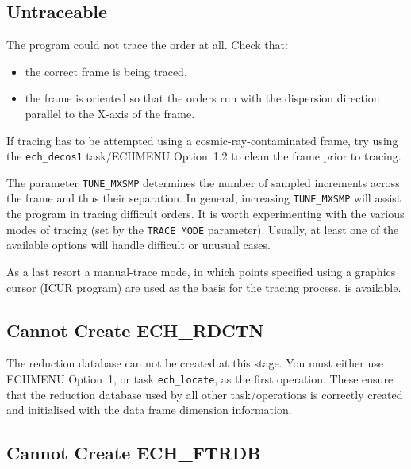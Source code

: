 \documentclass[11pt,twoside]{article}
\newcommand{\htmlref}[2]{#1}
\newcommand{\xlabel}[1]{}
\newcommand{\mlabel}[1]{\xlabel{#1}\label{#1}}
\newcommand{\myindex}[1]{\index{#1}}
\renewcommand{\myindex}[1]{}
\begin{document}
\subsection{\mlabel{untraceable} Untraceable}

 The program could not trace the order at all.  Check that:

\begin{itemize}

\item the correct frame is being traced.

\item the frame is oriented so that the orders run with the dispersion
      direction parallel to the X-axis of the frame.

\end{itemize}

 If tracing has to be attempted using a cosmic-ray-con\-tami\-nated
 frame, try using the \htmlref{{\tt ech\_decos1} task/ECHMENU Option~1.2}
 {ech_decos1} to clean the frame prior to tracing.

 The parameter \texttt{TUNE\_MXSMP} determines the number of sampled increments
 across the frame and thus their separation.  In general, increasing
 \texttt{TUNE\_MXSMP} will assist the program in tracing difficult orders.
 It is worth experimenting with the various modes of tracing (set by
 the \texttt{TRACE\_MODE} parameter).  Usually, at least one of the available
 options will handle difficult or unusual cases.

 As a last resort a manual-trace mode, in which points specified using
 a graphics cursor (ICUR program) are used as the basis for the tracing
 process, is available.


\subsection{\mlabel{cannot_create_ech_rdctn} Cannot Create ECH\_RDCTN}
\myindex{Reduction database!cannot create}

The reduction database can not be created at this stage. You must
either use ECHMENU Option~1, or task \htmlref{{\tt ech\_locate}}{ech_locate},
as the first operation.
These ensure that the reduction database used by all
other task/operations is correctly created and initialised with the data
frame dimension information.

\subsection{\mlabel{cannot_create_ech_ftrdb} Cannot Create ECH\_FTRDB}
\end{document}
